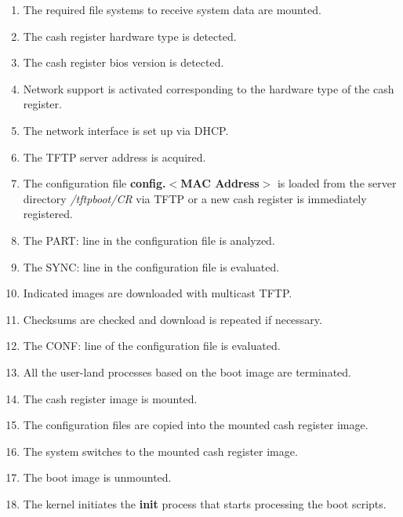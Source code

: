 \begin{enumerate}
      \item The required file systems to receive system data are mounted.
      \item The cash register hardware type is detected.
      \item The cash register bios version is detected.
      \item Network support is activated
                        corresponding to the hardware type of the cash register.
      \item The network interface is set up via DHCP.
      \item The TFTP server address is acquired.
      \item The configuration file \textbf{config.$<$MAC Address$>$}
                        is loaded from the server directory
            \textit{/tftpboot/CR} via TFTP or a new cash register
                        is immediately registered.
      \item The PART: line in the configuration file is analyzed.
      \item The SYNC: line in the configuration file is evaluated.
      \item Indicated images are downloaded with multicast TFTP.
      \item Checksums are checked and download is repeated if necessary.
      \item The CONF: line of the configuration file is evaluated.
      \item All the user-land processes based on the boot image are terminated.
      \item The cash register image is mounted.
      \item The configuration files are copied
            into the mounted cash register image.
      \item The system switches to the mounted cash register image.
      \item The boot image is unmounted.
      \item The kernel initiates
            the \textbf{init} process that starts processing the boot
            scripts.
\end{enumerate}

